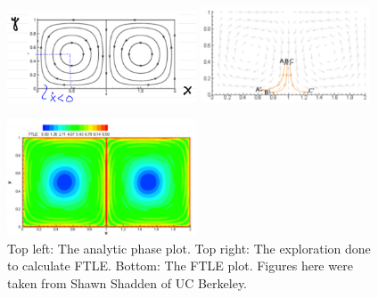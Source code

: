 \begin{ex}
\begin{figure}[h!]
	\centering
	\includegraphics[width=0.5\textwidth]{figures/ch1/11contour_phase.png}
	\hspace{0.03\textwidth}
	\includegraphics[width=0.45\textwidth]{figures/ch1/12ftle_exploration.png}
	\caption{}
	\includegraphics[width=0.5\textwidth]{figures/ch1/13ftle_final.png}
	\caption{Top left: The analytic phase plot. Top right: The exploration done to calculate FTLE. Bottom: The FTLE plot. Figures here were taken from Shawn Shadden of UC Berkeley.} \label{fig:FTLE_double_gyre}
\end{figure}
\end{ex}

